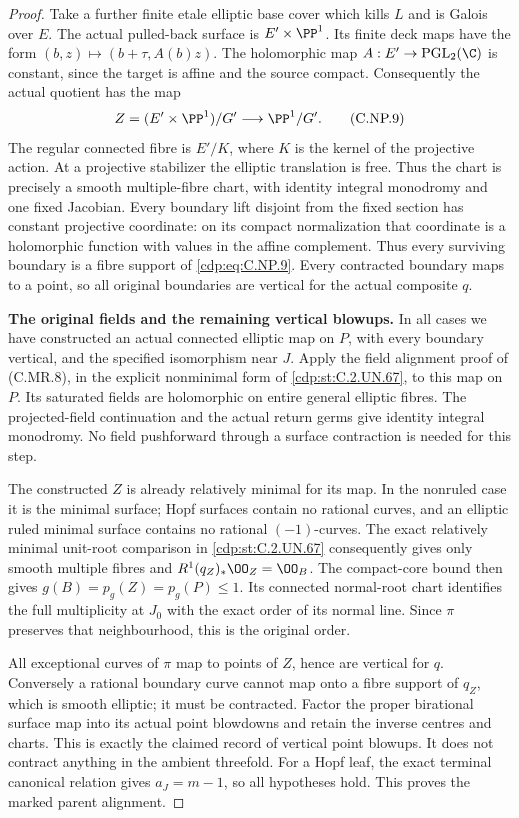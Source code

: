 \begin{proof}
Take a further finite
etale elliptic base cover
which kills \(L\) and
is Galois over \(E\).
The actual pulled-back
surface is \(E'\times\PP^1\).
Its finite deck maps have
the form
\((b,z)\mapsto(b+\tau,A(b)z)\).
The holomorphic map
\(A:E'\to\operatorname{PGL}_2(\C)\)
is constant, since the
target is affine and
the source compact.
Consequently the
actual quotient has
the map
\[
        Z=(E'\times\PP^1)/G'
                   \longrightarrow\PP^1/G'.
 \tag{C.NP.9}\label{cdp:eq:C.NP.9}
\]
The regular connected
fibre is \(E'/K\), where
\(K\) is the kernel of
the projective action.
At a projective stabilizer
the elliptic translation
is free. Thus the chart
is precisely a smooth
multiple-fibre chart,
with identity integral
monodromy and one fixed
Jacobian. Every boundary
lift disjoint from the
fixed section has constant
projective coordinate:
on its compact
normalization that
coordinate is a
holomorphic function
with values in the
affine complement.
Thus every surviving
boundary is a fibre
support of \eqref{cdp:eq:C.NP.9}.
Every contracted boundary
maps to a point, so
all original boundaries
are vertical for the
actual composite \(q\).

\par\medskip\noindent\textbf{The original fields and the remaining vertical blowups.}
In all cases we have
constructed an actual
connected elliptic map
on \(P\), with every
boundary vertical, and
the specified isomorphism
near \(J\). Apply the
field alignment proof
of (C.MR.8), in the
explicit nonminimal
form of \ref{cdp:st:C.2.UN.67}, to this
map on \(P\). Its
saturated fields are
holomorphic on entire
general elliptic fibres.
The projected-field
continuation and the
actual return germs
give identity integral
monodromy. No field
pushforward through a
surface contraction is
needed for this step.

The constructed \(Z\)
is already relatively
minimal for its map.
In the nonruled case
it is the minimal
surface; Hopf surfaces
contain no rational
curves, and an elliptic
ruled minimal surface
contains no rational
\((-1)\)-curves. The
exact relatively minimal
unit-root comparison in
\ref{cdp:st:C.2.UN.67} consequently gives
only smooth multiple
fibres and
\(R^1(q_Z)_*\OO_Z=\OO_B\).
The compact-core bound
then gives
\(g(B)=p_g(Z)=p_g(P)\le1\).
Its connected normal-root
chart identifies the full
multiplicity at \(J_0\)
with the exact order of
its normal line. Since
\(\pi\) preserves that
neighbourhood, this is
the original order.

All exceptional curves
of \(\pi\) map to
points of \(Z\), hence
are vertical for \(q\).
Conversely a rational
boundary curve cannot
map onto a fibre support
of \(q_Z\), which is
smooth elliptic; it
must be contracted.
Factor the proper
birational surface map
into its actual point
blowdowns and retain
the inverse centres
and charts. This is
exactly the claimed
record of vertical
point blowups. It
does not contract
anything in the
ambient threefold.
For a Hopf leaf,
the exact terminal
canonical relation
gives \(a_J=m-1\),
so all hypotheses
hold. This proves
the marked parent
alignment.
\end{proof}



